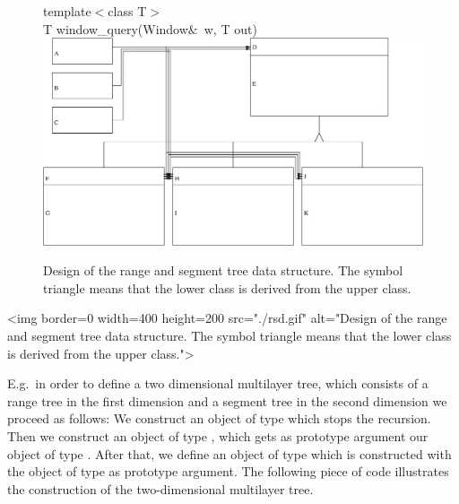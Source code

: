 \begin{ccTexOnly}
\begin{figure}
{{template$<$class T$>$\\
\hspace*{.2cm} T window\_query(Window$\&$~w, T out){}}}
\includegraphics[width=\textwidth,clip]{rangesegmentdesign.eps}
\caption{\label{rangesegmentdesign} Design of the range and
  segment tree data structure. The symbol triangle means
that the lower class is derived from the upper class. }
\end{figure}
\end{ccTexOnly}

\begin{ccHtmlOnly}
    <img border=0 width=400 height=200 src="./rsd.gif" alt="Design of the range and
  segment tree data structure. The symbol triangle means
that the lower class is derived from the upper class.">
\end{ccHtmlOnly}

E.g.\ in order to define a two dimensional multilayer tree, which
consists of a range tree  in the first dimension and a segment
tree in the second dimension we proceed as follows: We construct
an object of type  which stops the
recursion. Then we construct an object of type ,
which gets as prototype argument our object of type
. After that, we define an object of type
 which is constructed with the object of type
 as prototype argument.
The following piece of code illustrates
the construction of the two-dimensional multilayer tree.

